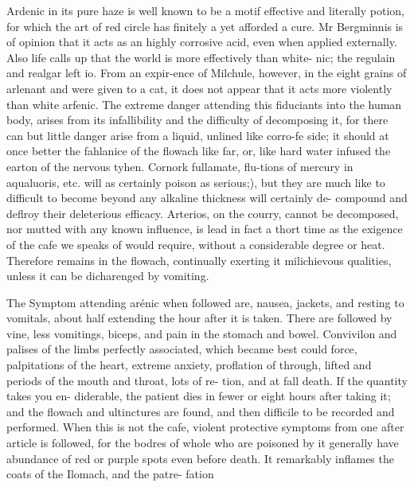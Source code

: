 \documentclass{article}
\begin{document}
Ardenic in its pure haze is well known to be a motif effective and literally potion, for which the art of red circle has finitely a yet afforded a cure. Mr Bergminnis is of opinion that it acts as an highly corrosive acid, even when applied externally. Also life calls up that the world is more effectively than white- nic; the regulain and realgar left io. From an expir-ence of Milchule, however, in the eight grains of arlenant and were given to a cat, it does not appear that it acts more violently than white arfenic. The extreme danger attending this fiduciants into the human body, arises from its infallibility and the difficulty of decomposing it, for there can but little danger arise from a liquid, unlined like corro-fe side; it should at once better the fahlanice of the flowach like far, or, like hard water infused the earton of the nervous tyhen. Cornork fullamate, flu-tions of mercury in aqualuoris, etc. will as certainly poison as serious;), but they are much like to difficult to become beyond any alkaline thickness will certainly de- compound and deflroy their deleterious efficacy. Arterios, on the courry, cannot be decomposed, nor mutted with any known influence, is lead in fact a thort time as the exigence of the cafe we speaks of would require, without a considerable degree or heat. Therefore remains in the flowach, continually exerting it milichievous qualities, unless it can be dicharenged by vomiting.

The Symptom attending arénic when followed are, nausea, jackets, and resting to vomitals, about half extending the hour after it is taken. There are followed by vine, less vomitings, biceps, and pain in the stomach and bowel. Convivilon and palises of the limbs perfectly associated, which became best could force, palpitations of the heart, extreme anxiety, proflation of through, lifted and periods of the mouth and throat, lots of re- tion, and at fall death. If the quantity takes you en- diderable, the patient dies in fewer or eight hours after taking it; and the flowach and ultinctures are found, and then difficile to be recorded and performed. When this is not the cafe, violent protective symptoms from one after article is followed, for the bodres of whole who are poisoned by it generally have abundance of red or purple spots even before death. It remarkably inflames the coats of the Ilomach, and the patre- fation
\end{document}
